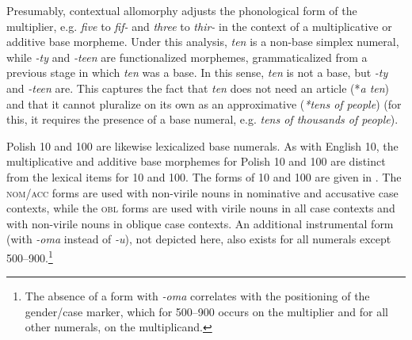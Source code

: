 \documentclass[output=paper]{langscibook}
\begin{document}

Presumably, contextual allomorphy adjusts the phonological form of the multiplier, e.g. \textit{five} to \textit{fif-} and \textit{three} to \textit{thir-} in the context of a multiplicative or additive base morpheme. Under this analysis, \textit{ten} is a non-base simplex numeral, while \textit{-ty} and \textit{-teen} are functionalized morphemes, grammaticalized from a previous stage in which \textit{ten} was a base. In this sense, \textit{ten} is not a base, but \textit{-ty} and \textit{-teen} are. This captures the fact that \textit{ten} does not need an article (*\textit{a ten}) and that it cannot pluralize on its own as an approximative (\textit{*tens of people}) (for this, it requires the presence of a base numeral, e.g. \textit{tens of thousands of people}).

Polish 10 and 100 are likewise lexicalized base numerals. As with English 10, the multiplicative and additive base morphemes for Polish 10 and 100 are distinct from the lexical items for 10 and 100. The forms of 10 and 100 are given in . The \textsc{nom/acc} forms are used with non-virile nouns in nominative and accusative case contexts, while the \textsc{obl} forms are used with virile nouns in all case contexts and with non-virile nouns in oblique case contexts. An additional instrumental form (with \textit{-oma} instead of \textit{-u}), not depicted here, also exists for all numerals except 500--900.\footnote{The absence of a form with \textit{-oma} correlates with the positioning of the gender/case marker, which for 500--900 occurs on the multiplier and for all other numerals, on the multiplicand.\label{klo:fn:inst}}
\end{document}
